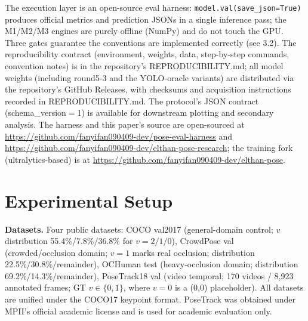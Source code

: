\documentclass[10pt,conference]{IEEEtran}
\begin{document}
The execution layer is an open-source eval harness: \texttt{model.val(save\_json=True)} produces official metrics and prediction JSONs in a single inference pass; the M1/M2/M3 engines are purely offline (NumPy) and do not touch the GPU. Three gates guarantee the conventions are implemented correctly (see 3.2). The reproducibility contract (environment, weights, data, step-by-step commands, convention notes) is in the repository's REPRODUCIBILITY.md; all model weights (including round5-3 and the YOLO-oracle variants) are distributed via the repository's GitHub Releases, with checksums and acquisition instructions recorded in REPRODUCIBILITY.md. The protocol's JSON contract (schema\_version$=$1) is available for downstream plotting and secondary analysis. The harness and this paper's source are open-sourced at \url{https://github.com/fanyifan090409-dev/pose-eval-harness} and \url{https://github.com/fanyifan090409-dev/elthan-pose-research}; the training fork (ultralytics-based) is at \url{https://github.com/fanyifan090409-dev/elthan-pose}.

\section{Experimental Setup}

\textbf{Datasets.} Four public datasets: COCO val2017 (general-domain control; $v$ distribution 55.4\%/7.8\%/36.8\% for $v{=}2/1/0$), CrowdPose val (crowded/occlusion domain; $v{=}1$ marks real occlusion; distribution 22.5\%/30.8\%/remainder), OCHuman test (heavy-occlusion domain; distribution 69.2\%/14.3\%/remainder), PoseTrack18 val (video temporal; 170 videos / 8,923 annotated frames; GT $v\in\{0,1\}$, where $v{=}0$ is a (0,0) placeholder). All datasets are unified under the COCO17 keypoint format. PoseTrack was obtained under MPII's official academic license and is used for academic evaluation only.
\end{document}
